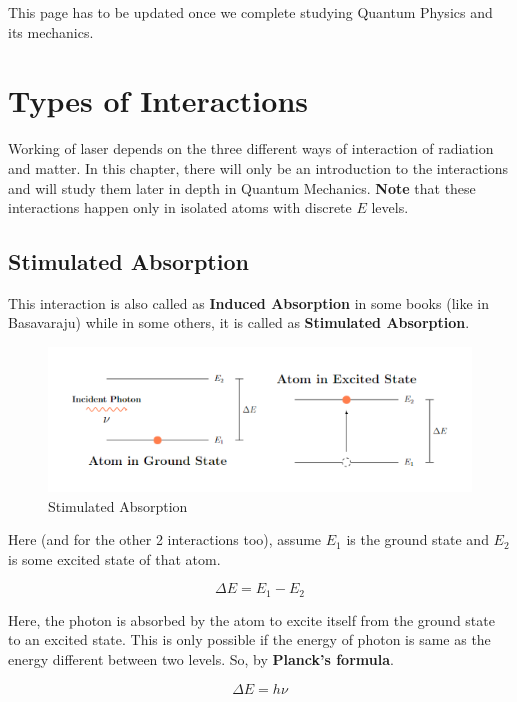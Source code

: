 \documentclass[12pt]{article}
\begin{document}
This page has to be updated once we complete studying Quantum Physics and its mechanics.

\section{Types of Interactions}

Working of laser depends on the three different ways of interaction of radiation and matter. In this chapter, there will only be an introduction to the interactions and will study them later in depth in Quantum Mechanics. \textbf{Note} that these interactions happen only in isolated atoms with discrete $E$ levels.

\subsection{Stimulated Absorption}

This interaction is also called as \textbf{Induced Absorption} in some books (like in Basavaraju) while in some others, it is called as \textbf{Stimulated Absorption}.

\begin{figure}[H]
    \centering
    \includegraphics[scale=0.5]{./img/03_induced_absorption.png}
    \caption{Stimulated Absorption}
\end{figure}

Here (and for the other 2 interactions too), assume $E_{1}$ is the ground state and $E_{2}$ is some excited state of that atom.

\begin{equation}
    \Delta E = E_{1} - E_{2}
\end{equation}

Here, the photon is absorbed by the atom to excite itself from the ground state to an excited state. This is only possible if the energy of photon is same as the energy different between two levels. So, by \textbf{Planck's formula}.

\begin{equation}
    \Delta E = h\nu
\end{equation}
\end{document}
